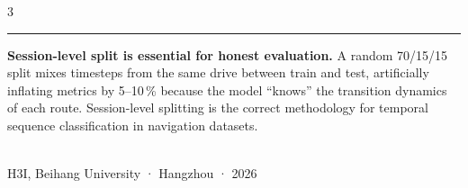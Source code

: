 \documentclass[20pt]{extarticle}
\newcommand{\posec}[1]{\vspace{4pt}{\large\bfseries\color{buaaNavy}#1}\\[-4pt]
  {\color{buaaBlue}\rule{\linewidth}{1.5pt}}\vspace{4pt}}
\begin{document}
\begin{multicols}{3}
\posec{Key Lesson}
\begin{poblock}
\textbf{Session-level split is essential for honest evaluation.}
A random 70/15/15 split mixes timesteps from the same drive between train and test,
artificially inflating metrics by 5–10\,\% because the model ``knows'' the transition
dynamics of each route.
Session-level splitting is the correct methodology for temporal sequence classification
in navigation datasets.
\end{poblock}

\end{multicols}

\noindent{\color{buaaBlue}\rule{\linewidth}{1.5pt}}\\[2pt]
{\small\color{buaaNavy}\centering H3I, Beihang University · Hangzhou · 2026}
\end{document}
